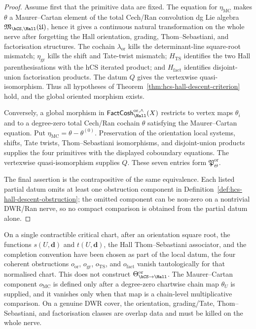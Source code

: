 \begin{proof}
Assume first that the primitive data are fixed. The equation for
$\eta_{\mathrm{MC}}$ makes $\theta$ a Maurer--Cartan element of the total
Cech/Ran convolution dg Lie algebra
$\mathfrak M_{\hCS,\Hall}(\mathfrak U)$, hence it gives a continuous
natural transformation on the whole nerve after forgetting the Hall
orientation, grading, Thom--Sebastiani, and factorisation structures.
The cochain $\lambda_{\mathrm{or}}$ kills the determinant-line
square-root mismatch; $\eta_{\mathrm{gr}}$ kills the shift and Tate-twist
mismatch; $H_{\mathrm{TS}}$ identifies the two Hall parenthesisations
with the hCS iterated product; and $H_{\mathrm{fact}}$ identifies
disjoint-union factorisation products. The datum $Q$ gives the
vertexwise quasi-isomorphism. Thus all hypotheses of
Theorem~\ref{thm:hcs-hall-descent-criterion} hold, and the global
oriented morphism exists.

Conversely, a global morphism in
$\mathsf{FactCosh}_{\Hall}^{\mathrm{or},\wedge}(X)$ restricts to vertex
maps $\theta_i$ and to a degree-zero total Cech/Ran cochain $\theta$
satisfying the Maurer--Cartan equation. Put
$\eta_{\mathrm{MC}}=\theta-\theta^{(0)}$. Preservation of the
orientation local systems, shifts, Tate twists, Thom--Sebastiani
isomorphisms, and disjoint-union products supplies the four primitives
with the displayed coboundary equations. The vertexwise
quasi-isomorphism supplies $Q$. These seven entries form
$\mathfrak P_{\Theta}^{\mathrm{or}}$.

The final assertion is the contrapositive of the same equivalence.
Each listed partial datum omits at least one obstruction component in
Definition~\ref{def:hcs-hall-descent-obstruction}; the omitted component
can be non-zero on a nontrivial DWR/Ran nerve, so no compact comparison
is obtained from the partial datum alone.
\end{proof}

\begin{remark}
\label{rem:hcs-hall-one-chart-normalisation}
On a single contractible critical chart, after an orientation square
root, the functions $s(U,\mathbf d)$ and $t(U,\mathbf d)$, the Hall
Thom--Sebastiani associator, and the completion convention have been
chosen as part of the local datum, the four coherent obstructions
$o_{\mathrm{or}}$, $o_{\mathrm{gr}}$, $o_{\mathrm{TS}}$, and
$o_{\mathrm{fact}}$ vanish tautologically for that normalised chart.
This does not construct
$\Theta_{\hCS\to\Hall}^{\mathrm{or}}$. The Maurer--Cartan component
$o_{\mathrm{MC}}$ is defined only after a degree-zero chartwise chain map
$\theta_U$ is supplied, and it vanishes only when that map is a
chain-level multiplicative comparison. On a genuine DWR cover, the
orientation, grading/Tate, Thom--Sebastiani, and factorisation classes
are overlap data and must be killed on the whole nerve.
\end{remark}

